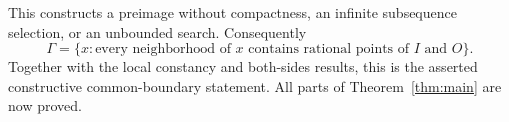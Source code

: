 This constructs a preimage without compactness, an infinite
subsequence selection, or an unbounded search. Consequently
\[
 \Gamma=\{x:\text{every neighborhood of }x
                    \text{ contains rational points of }I\text{ and }O\}.
\]
Together with the local constancy and both-sides results, this
is the asserted constructive common-boundary statement.
All parts of Theorem~\ref{thm:main} are now proved.
